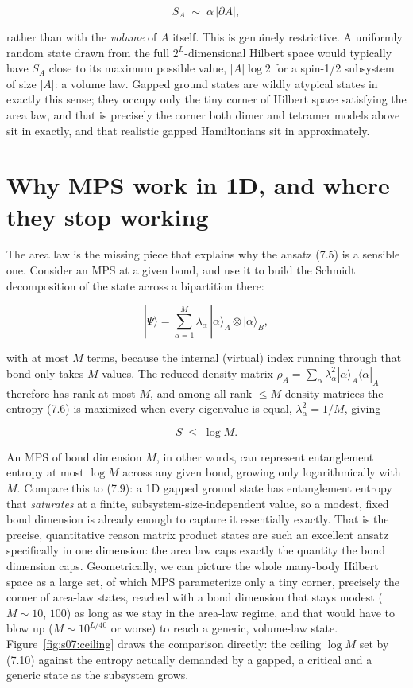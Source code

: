 \begin{equation}
S_A \;\sim\; \alpha\, |\partial A|,
\end{equation}

rather than with the \emph{volume} of $A$ itself. This is genuinely restrictive. A uniformly random state
drawn from the full $2^L$-dimensional Hilbert space would typically have $S_A$ close to its maximum
possible value, $|A|\log 2$ for a spin-1/2 subsystem of size $|A|$: a volume law. Gapped ground states
are wildly atypical states in exactly this sense; they occupy only the tiny corner of Hilbert space
satisfying the area law, and that is precisely the corner both dimer and tetramer models above sit in
exactly, and that realistic gapped Hamiltonians sit in approximately.

\section{Why MPS work in 1D, and where they stop working}

The area law is the missing piece that explains why the ansatz (7.5) is a sensible one. Consider an MPS
at a given bond, and use it to build the Schmidt decomposition of the state across a bipartition there:

\begin{equation*}
|\Psi\rangle = \sum_{\alpha=1}^{M} \lambda_\alpha\, |\alpha\rangle_A \otimes |\alpha\rangle_B,
\end{equation*}

with at most $M$ terms, because the internal (virtual) index running through that bond only takes $M$
values. The reduced density matrix $\rho_A = \sum_\alpha \lambda_\alpha^2 |\alpha\rangle_A
\langle\alpha|_A$ therefore has rank at most $M$, and among all rank-$\le M$ density matrices the
entropy (7.6) is maximized when every eigenvalue is equal, $\lambda_\alpha^2 = 1/M$, giving

\begin{equation}
S \;\le\; \log M.
\end{equation}

An MPS of bond dimension $M$, in other words, can represent entanglement entropy at most $\log M$
across any given bond, growing only logarithmically with $M$. Compare this to (7.9): a 1D gapped ground
state has entanglement entropy that \emph{saturates} at a finite, subsystem-size-independent value, so a
modest, fixed bond dimension is already enough to capture it essentially exactly. That is the precise,
quantitative reason matrix product states are such an excellent ansatz specifically in one dimension:
the area law caps exactly the quantity the bond dimension caps. Geometrically, we can picture the whole
many-body Hilbert space as a large set, of which MPS parameterize only a tiny corner, precisely the
corner of area-law states, reached with a bond dimension that stays modest ($M \sim 10$, $100$) as long
as we stay in the area-law regime, and that would have to blow up ($M \sim 10^{L/40}$ or worse) to reach
a generic, volume-law state. Figure~\ref{fig:s07:ceiling} draws the comparison directly: the ceiling
$\log M$ set by (7.10) against the entropy actually demanded by a gapped, a critical and a generic
state as the subsystem grows.

